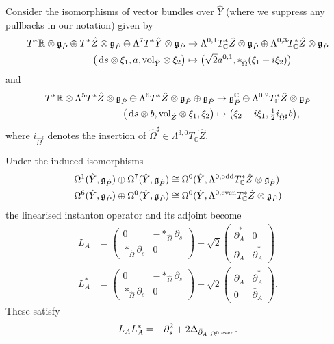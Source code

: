 \documentclass[11pt,a4paper]{scrartcl}
\newcommand*\diff{\mathop{}\!\textup{d}}
\newcommand{\vol}{\textup{vol}}
\numberwithin{equation}{section}
\theoremstyle{plain}
\theoremstyle{definition}
\theoremstyle{remark}
\begin{document}
\begin{lemma}
Consider the isomorphisms of vector bundles over $\hat{Y}$ (where we suppress any pullbacks in our notation) given by
\begin{align*}
T^*\mathbb{R}\otimes \mathfrak{g}_{\hat{P}} \oplus T^*\hat{Z}\otimes \mathfrak{g}_{\hat{P}} \oplus \Lambda^7T^* \hat{Y}\otimes \mathfrak{g}_{\hat{P}} &\to \Lambda^{0,1}T^*_\mathbb{C}\hat{Z}\otimes \mathfrak{g}_{\hat{P}} \oplus \Lambda^{0,3}T^*_\mathbb{C}\hat{Z}\otimes \mathfrak{g}_{\hat{P}} \\
\big(\diff s \otimes \xi_1, a, \vol_{\hat{Y}} \otimes \xi_2 \big) & \mapsto \big(\sqrt{2} a^{0,1},*_{\hat{\Omega}}(\xi_1+i\xi_2) \big)
\end{align*}
and
\begin{align*}
T^*\mathbb{R}\otimes \Lambda^5T^*\hat{Z}\otimes \mathfrak{g}_{\hat{P}} \oplus \Lambda^6
T^*\hat{Z}\otimes \mathfrak{g}_{\hat{P}} \oplus \mathfrak{g}_{\hat{P}} &\to  \mathfrak{g}_{\hat{P}}^\mathbb{C} \oplus \Lambda^{0,2}T^*_\mathbb{C}\hat{Z}\otimes \mathfrak{g}_{\hat{P}} \\
\big(\diff s \otimes b, \vol_{\hat{Z}} \otimes \xi_1, \xi_2  \big) & \mapsto \big(\xi_2-i\xi_1, \tfrac{1}{2} i_{\hat{\Omega}^\sharp} b \big),
\end{align*}
where $i_{\hat{\Omega}^\sharp}$ denotes the insertion of $\hat{\Omega}^\sharp \in \Lambda^{3,0}T_\mathbb{C}\hat{Z}$.

Under the induced isomorphisms 
\begin{align*}
\Omega^1(\hat{Y},\mathfrak{g}_{\hat{P}}) \oplus \Omega^7(\hat{Y},\mathfrak{g}_{\hat{P}}) &\cong \Omega^0(\hat{Y},\Lambda^{0,\textup{odd}}T^*_\mathbb{C}\hat{Z} \otimes \mathfrak{g}_{\hat{P}}) \\
\Omega^6(\hat{Y},\mathfrak{g}_{\hat{P}}) \oplus \Omega^0(\hat{Y},\mathfrak{g}_{\hat{P}}) &\cong \Omega^0(\hat{Y},\Lambda^{0,\textup{even}}T^*_\mathbb{C}\hat{Z} \otimes \mathfrak{g}_{\hat{P}})
\end{align*}
the linearised instanton operator and its adjoint become \begin{align*}
L_A &= 
\begin{pmatrix}
0 &  - *_{\hat{\Omega}}\partial_s  \\
*_{\hat{\Omega}} \partial_s  & 0
\end{pmatrix}
+ \sqrt{2} 
\begin{pmatrix}
\bar{\partial}_A^* & 0 \\
\bar{\partial}_A &  \bar{\partial}_A^*
\end{pmatrix}\\
L_A^* & = 
\begin{pmatrix}
0 & - *_{\hat{\Omega}}\partial_s \\
 *_{\hat{\Omega}} \partial_s & 0 
\end{pmatrix}
+ \sqrt{2} 
\begin{pmatrix}
\bar{\partial}_A & \bar{\partial}_A^* \\
0 &  \bar{\partial}_A
\end{pmatrix}.
\end{align*}
These satisfy \[ L_A L_A^* = - \partial_s^2 +2 {\Delta_{\bar{\partial}_A}}_{\vert \Omega^{0,\textup{even}}}.\]


\end{lemma}
\end{document}
